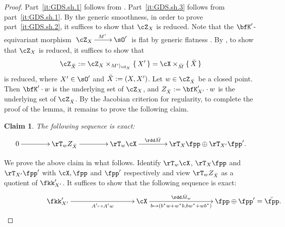 \documentclass[12pt,a4paper]{amsart}
\newcommand{\trivial}[2][]{\if\relax\detokenize{#1}\relax
  {%
      \color{orange} \vspace{0em} $[$  #2 $]$
      \color{black}
  }
  \else
\ifx#1h
\ifcsname showtrivial\endcsname
{%
    \color{orange} \vspace{0em}  $[$ #2 $]$
    \color{black}
}
\fi
\else {\red Wrong argument!} \fi
\fi
}
\numberwithin{equation}{section}
\newtheorem*{thm*}{Theorem}
\newtheorem*{claim*}{Claim}
\theoremstyle{remark}
\def\MMP{M}
\def\mstar{{\star}}
\def\ZX{\cZ_{X}}
\begin{document}
\begin{proof} Part~\cref{it:GDS.sh.1} follows from \cite[Table~4]{DKP2}. Part~\cref{it:GDS.sh.3} follows from part~\cref{it:GDS.sh.1}. By the generic smoothness, in order to prove
  part~\cref{it:GDS.sh.2}, it suffices to show that $\ZX$ is reduced.
  Note that the $\bfK'$-equivariant morphism $\xymatrix{\ZX\ar[r]^{M'}&\sO'}$ is
  flat by generic flatness \cite[Th\'eor\`eme~6.9.1]{EGAIV2}.
  By \cite[Proposition~11.3.13]{EGAIV3}, to show that $\ZX$ is reduced, it
  suffices to show that
  $$\ZdbX := \ZZ_X \times_{M'|_{\ZX}}\set{X'} = \cX \times_{\dbM}\set{\dbX}$$
  is reduced, where $X'\in \sO'$ and $\breve{X}:=(X,X')$.
  Let $w\in\ZdbX$ be a closed point. Then $\bfK'\cdot w$ is the underlying set of $\ZX$, and
  $Z_{\dbX}:=\bfK'_{X'}\cdot w$ is the underlying set of
  $\ZdbX$.  By
  the Jacobian criterion for regularity, to complete the proof of the lemma, it remains to prove the following claim.

  \begin{claim*}
    The following sequence is exact:
    \begin{equation} \label{eq:GDS.T1} \xymatrix@C=4em{ 0 \ar[r] & \rT_w
        Z_{\dbX} \ar[r] & \rT_w\cX \ar[r]^<>(.5){\rdd \dbM} &
        \rT_{X}{\fpp}\oplus \rT_{X'}{\fpp'}. }
    \end{equation}
  \end{claim*}

We prove the above claim in what follows.
    Identify $\rT_w\cX$, $\rT_X\fpp$ and $\rT_{X'}\fpp'$ with $\cX,\fpp$ and
    $\fpp'$ respectively and view $\rT_{w} Z_{\dbX}$ as a quotient of
    $\fkk'_{X'}$. It suffices to show that the following sequence is exact:
    \begin{equation}\label{eq:GDS.T2}
      \xymatrix@R=0em@C=9em{
        \fkk'_{X'} \ar[r]_<>(.5){A' \mapsto A'w}& \cX\ar[r]^<>(.5){\rdd \dbM_{w}}_<>(.5){ b\mapsto (b^\mstar w+w^\mstar b, b w^\mstar + w b^\mstar) }&
        \makebox[0em][l]{$\fpp\oplus \fpp' =\dbfpp$.}\\
      }
    \end{equation}


\end{proof}
\end{document}
